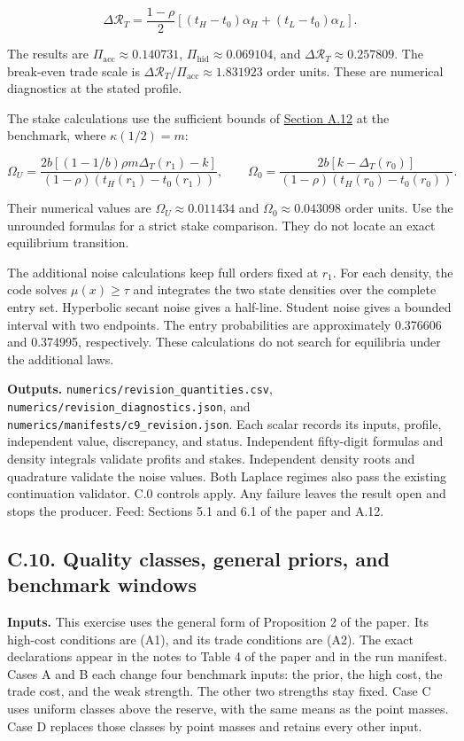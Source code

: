 \documentclass[
  11pt,
]{article}
\begin{document}
\[
\Delta\mathcal R_T=\frac{1-\rho}{2}\left[(t_H-t_0)\alpha_H+(t_L-t_0)\alpha_L\right].
\]

The results are \(\Pi_{\mathrm{acc}}\approx0.140731\),
\(\Pi_{\mathrm{hid}}\approx0.069104\), and
\(\Delta\mathcal R_T\approx0.257809\). The break-even trade scale
is \(\Delta\mathcal R_T/\Pi_{\mathrm{acc}}\approx1.831923\)
order units. These are numerical diagnostics at the stated profile.

The stake calculations use the sufficient bounds of
\hyperref[oa-a-stake]{Section A.12} at the benchmark, where
\(\kappa(1/2)=m\):

\[
\Omega_U=\frac{2b[(1-1/b)\rho m\Delta_T(r_1)-k]}{(1-\rho)(t_H(r_1)-t_0(r_1))},
\qquad
\Omega_0=\frac{2b[k-\Delta_T(r_0)]}{(1-\rho)(t_H(r_0)-t_0(r_0))}.
\]

Their numerical values are \(\Omega_U\approx0.011434\) and
\(\Omega_0\approx0.043098\) order units. Use the unrounded formulas
for a strict stake comparison. They do not locate an exact equilibrium
transition.

The additional noise calculations keep full orders fixed at \(r_1\).
For each density, the code solves \(\mu(x)\ge\tau\) and integrates the
two state densities over the complete entry set. Hyperbolic secant noise
gives a half-line. Student noise gives a bounded interval with two
endpoints. The entry probabilities are approximately
0.376606 and 0.374995, respectively.
These calculations do not search for equilibria under the additional
laws.

\textbf{Outputs.} \texttt{numerics/revision\_quantities.csv},
\texttt{numerics/revision\_diagnostics.json}, and
\texttt{numerics/manifests/c9\_revision.json}. Each scalar records its
inputs, profile, independent value, discrepancy, and status. Independent
fifty-digit formulas and density integrals validate profits and stakes.
Independent density roots and quadrature validate the noise values. Both
Laplace regimes also pass the existing continuation validator. C.0
controls apply. Any failure leaves the result open and stops the
producer. Feed: Sections 5.1 and 6.1 of the paper and A.12.

\subsection{C.10. Quality classes, general priors, and benchmark
windows}\label{oa-c-classes}

\textbf{Inputs.} This exercise uses the general form of Proposition 2
of the paper. Its high-cost conditions are (A1), and its trade
conditions are (A2). The exact declarations appear in the notes to
Table 4 of the paper and in the run manifest. Cases A and B each change
four benchmark inputs: the prior, the high cost, the trade cost, and
the weak strength. The other two strengths stay fixed. Case C uses uniform
classes above the reserve, with the same means as the point masses.
Case D replaces those classes by point masses and retains every other
input.
\end{document}
